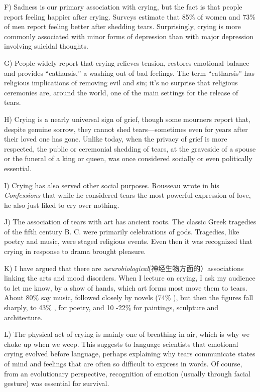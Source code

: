 \documentclass[UTF8,11pt]{ctexart}
\begin{document}
F) Sadness is our primary association with crying, but the fact is that people report feeling happier after crying. Surveys estimate that 85\% of women and 73\% of men report feeling better after shedding tears. Surprisingly, crying is more commonly associated with minor forms of depression than with major depression involving suicidal thoughts.


G) People widely report that crying relieves tension, restores emotional balance and provides “catharsis,” a washing out of bad feelings. The term “catharsis” has religious implications of removing evil and sin; it’s no surprise that religious ceremonies are, around the world, one of the main settings for the release of tears.


H) Crying is a nearly universal sign of grief, though some mourners report that, despite genuine sorrow, they cannot shed tears—sometimes even for years after their loved one has gone. Unlike today, when the privacy of grief is more respected, the public or ceremonial shedding of tears, at the graveside of a spouse or the funeral of a king or queen, was once considered socially or even politically essential.


I) Crying has also served other social purposes. Rousseau wrote in his\textit{ Confessions} that while he considered tears the most powerful expression of love, he also just liked to cry over nothing.


J) The association of tears with art has ancient roots. The classic Greek tragedies of the fifth century B. C. were primarily celebrations of gods. Tragedies, like poetry and music, were staged religious events. Even then it was recognized that crying in response to drama brought pleasure.


K) I have argued that there are\textit{ neurobiological}(神经生物方面的）associations linking the arts and mood disorders. When I lecture on crying, I ask my audience to let me know, by a show of hands, which art forms most move them to tears. About 80\% say music, followed closely by novels (74\% ), but then the figures fall sharply, to 43\% , for poetry, and 10 -22\% for paintings, sculpture and architecture.


L) The physical act of crying is mainly one of breathing in air, which is why we choke up when we weep. This suggests to language scientists that emotional crying evolved before language, perhaps explaining why tears communicate states of mind and feelings that are often so difficult to express in words. Of course, from an evolutionary perspective, recognition of emotion (usually through facial gesture) was essential for survival.
\end{document}

